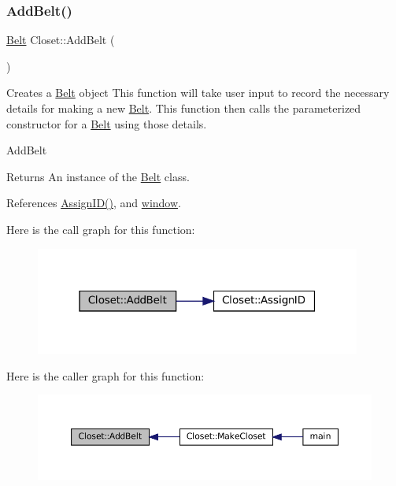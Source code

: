 \subsubsection{\texorpdfstring{Add\+Belt()}{AddBelt()}}
{\footnotesize\ttfamily \mbox{\hyperlink{classBelt}{Belt}} Closet\+::\+Add\+Belt (\begin{DoxyParamCaption}{ }\end{DoxyParamCaption})\hspace{0.3cm}{\ttfamily [private]}}



Creates a \textquotesingle{}\mbox{\hyperlink{classBelt}{Belt}}\textquotesingle{} object  This function will take user input to record the necessary details for making a new \textquotesingle{}\mbox{\hyperlink{classBelt}{Belt}}\textquotesingle{}. This function then calls the parameterized constructor for a \textquotesingle{}\mbox{\hyperlink{classBelt}{Belt}}\textquotesingle{} using those details. 

Add\+Belt \begin{DoxyReturn}{Returns}
An instance of the \textquotesingle{}\mbox{\hyperlink{classBelt}{Belt}}\textquotesingle{} class. 
\end{DoxyReturn}


References \mbox{\hyperlink{classCloset_afabc27d621abdf0089a6b3027ea8f470}{Assign\+I\+D()}}, and \mbox{\hyperlink{classCloset_af1eb4f786cc4eccd3018b90632236a93}{window}}.

Here is the call graph for this function\+:
\nopagebreak
\begin{figure}[H]
\begin{center}
\leavevmode
\includegraphics[width=304pt]{classCloset_ad81782f2bb110f3a0a635a5ac1f929eb_cgraph}
\end{center}
\end{figure}
Here is the caller graph for this function\+:
\nopagebreak
\begin{figure}[H]
\begin{center}
\leavevmode
\includegraphics[width=350pt]{classCloset_ad81782f2bb110f3a0a635a5ac1f929eb_icgraph}
\end{center}
\end{figure}
\mbox{\label{classCloset_a86001d9aab63ec5cca05bb2daa67e755}} 
